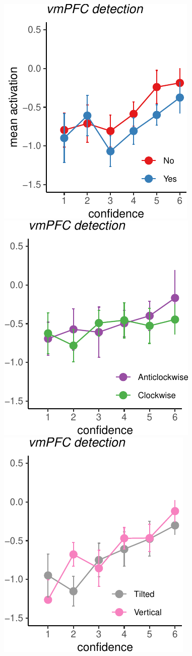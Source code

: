 \documentclass[
]{article}
\begin{document}
~

\includegraphics{Chudi-Thesis-2020_files/figure-latex/unnamed-chunk-9-1.pdf}
\includegraphics{Chudi-Thesis-2020_files/figure-latex/unnamed-chunk-9-2.pdf}
\includegraphics{Chudi-Thesis-2020_files/figure-latex/unnamed-chunk-9-3.pdf}
\end{document}
